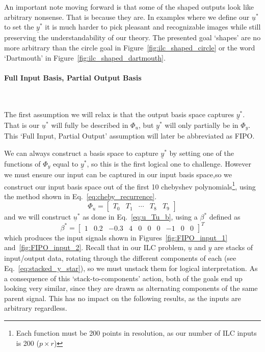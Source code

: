 An important note moving forward is that some of the shaped outputs look like arbitrary nonsense. That is because they are. In examples where we define our $\underline{u}^\ast$ to set the $\underline{y}^\ast$ it is much harder to pick pleasant and recognizable images while still preserving the understandability of our theory. The presented goal `shapes' are no more arbitrary than the circle goal in Figure~\ref{fig:ilc_shaped_circle} or the word `Dartmouth' in Figure~\ref{fig:ilc_shaped_dartmouth}. 

\FloatBarrier\paragraph{Full Input Basis, Partial Output Basis}
~\label{par:fipo}

The first assumption we will relax is that the output basis space captures $\underline{y}^\ast$. That is our $\underline{u}^\ast$ will fully be described in $\Phi_u$, but $\underline{y}^\ast$ will only partially be in $\Phi_y$. This `Full Input, Partial Output' assumption will later be abbreviated as FIPO.%

We can always construct a basis space to capture $\underline{y}^\ast$ by setting one of the functions of $\Phi_y$ equal to $\underline{y}^\ast$, so this is the first logical one to challenge. However we must ensure our input can be captured in our input basis space,so we construct our input basis space out of the first 10 chebyshev polynomials\footnote{Each function must be 200 points in resolution,  as our number of ILC inputs is 200 ($p \times r$)}, using the method shown in Eq.~\ref{eq:cheby_recurrence}.
\begin{equation}
    \Phi_u = 
    \begin{bmatrix}
        T_0 & T_1 & \cdots & T_8 & T_9
    \end{bmatrix}
    \label{eq:Tu_in_cheby}
\end{equation}
and we will construct $\underline{u}^\ast$ as done in Eq.~\ref{eq:u_Tu_b}, using a $\beta^\ast$ defined as
\begin{equation}
    \beta^\ast = {\begin{bmatrix}1 & 0.2 & -0.3 & 4 & 0 & 0 & 0 & -1 & 0 & 0\end{bmatrix}}^T
    \label{eq:beta_star_in_basis}
\end{equation}
which produces the input signals shown in Figures~\ref{fig:FIPO_input_1} and~\ref{fig:FIPO_input_2}. Recall that in our ILC problem, $\underline{u}$ and $\underline{y}$ are stacks of input/output data, rotating through the different components of each (see Eq.~\ref{eq:stacked_y_star}), so we must unstack them for logical interpretation. As a consequence of this `stack-to-components' action, both of the goals end up looking very similar, since they are drawn as alternating components of the same parent signal. This has no impact on the following results, as the inputs are arbitrary regardless.

